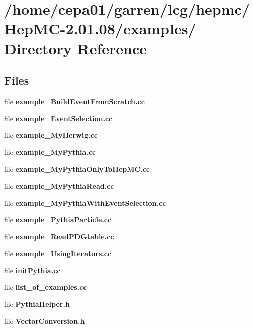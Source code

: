 \section{/home/cepa01/garren/lcg/hepmc/Hep\-MC-2.01.08/examples/ Directory Reference}
\label{dir_a21962e77012aa68665660946b15ca42}
\subsection*{Files}
\begin{CompactItemize}
\item 
file {\bf example\_\-Build\-Event\-From\-Scratch.cc}
\item 
file {\bf example\_\-Event\-Selection.cc}
\item 
file {\bf example\_\-My\-Herwig.cc}
\item 
file {\bf example\_\-My\-Pythia.cc}
\item 
file {\bf example\_\-My\-Pythia\-Only\-To\-Hep\-MC.cc}
\item 
file {\bf example\_\-My\-Pythia\-Read.cc}
\item 
file {\bf example\_\-My\-Pythia\-With\-Event\-Selection.cc}
\item 
file {\bf example\_\-Pythia\-Particle.cc}
\item 
file {\bf example\_\-Read\-PDGtable.cc}
\item 
file {\bf example\_\-Using\-Iterators.cc}
\item 
file {\bf init\-Pythia.cc}
\item 
file {\bf list\_\-of\_\-examples.cc}
\item 
file {\bf Pythia\-Helper.h}
\item 
file {\bf Vector\-Conversion.h}
\end{CompactItemize}
